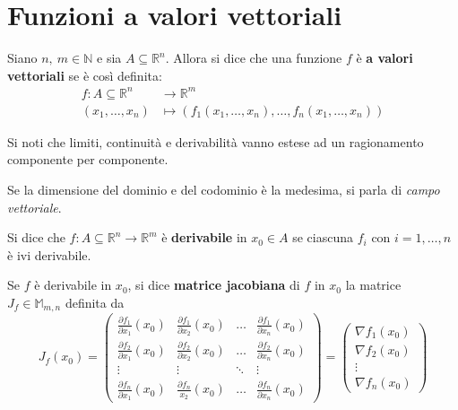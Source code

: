 \section{Funzioni a valori vettoriali}
\begin{definition} \label{Def: Funzioni a valori vettoriali}
    Siano $n,\ m \in \mathbb{N}$ e sia $A \subseteq \mathbb{R}^n$. Allora si dice che una funzione $f$ è \textbf{a valori vettoriali} se è così definita:
    \begin{equation}
    \begin{aligned}
        f:A \subseteq \mathbb{R}^n &\to \mathbb{R}^m\\
        (x_1, \dots, x_n) &\mapsto (f_1(x_1, \dots, x_n), \dots, f_n(x_1, \dots, x_n))
    \end{aligned}
    \end{equation}
\end{definition}
\begin{oss}
    Si noti che limiti, continuità e derivabilità vanno estese ad un ragionamento componente per componente.
\end{oss}
\begin{oss}
    Se la dimensione del dominio e del codominio è la medesima, si parla di \textit{campo vettoriale}.
\end{oss}
\begin{definition} \label{Def: Derivabilità di f. vettoriali}
    Si dice che $f:A \subseteq \mathbb{R}^n \to \mathbb{R}^m$ è \textbf{derivabile} in $x_0 \in A$ se ciascuna $f_i$ con $i=1, \dots, n$ è ivi derivabile.
\end{definition}
\begin{definition} \label{Def: Matrice Jacobiana}
    Se $f$ è derivabile in $x_0$, si dice \textbf{matrice jacobiana} di $f$ in $x_0$ la matrice $J_f \in \mathbb{M}_{m,n}$ definita da
    \begin{equation} \label{Eq: Matrice Jacobiana}
        J_f(x_0)=\begin{pmatrix}
            \frac{\partial{f_1}}{\partial{x_1}}(x_0) & \frac{\partial{f_1}}{\partial{x_2}}(x_0)& \dots & \frac{\partial{f_1}}{\partial{x_n}}(x_0)\\
            \frac{\partial{f_2}}{\partial{x_1}}(x_0)& \frac{\partial{f_2}}{\partial{x_2}}(x_0)& \dots & \frac{\partial{f_2}}{\partial{x_n}}(x_0)\\
            \vdots & \vdots & \ddots & \vdots\\
            \frac{\partial{f_n}}{\partial{x_1}}(x_0) & \frac{\partial{f_n}}{x_2}(x_0)& \dots & \frac{\partial{f_n}}{\partial{x_n}}(x_0)
        \end{pmatrix}
        =
        \begin{pmatrix}
            \nabla f_1 (x_0)\\
            \nabla f_2(x_0)\\
            \vdots\\
            \nabla f_n(x_0)
        \end{pmatrix}
    \end{equation}
\end{definition}
